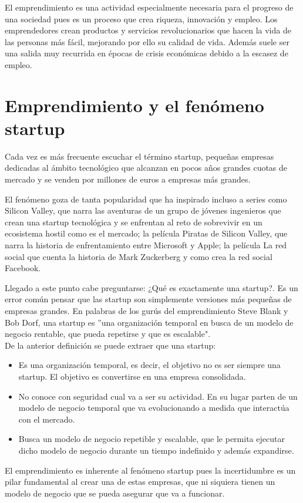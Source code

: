 El emprendimiento es una actividad especialmente necesaria para el progreso de una sociedad pues es un proceso que crea riqueza, innovación y empleo. Los emprendedores crean productos y servicios revolucionarios que hacen la vida de las personas más fácil, mejorando por ello su calidad de vida. Además suele ser una salida muy recurrida en épocas de crisis económicas debido a la escasez de empleo.

\section{Emprendimiento y el fenómeno startup}

Cada vez es más frecuente escuchar el término startup, pequeñas empresas dedicadas al ámbito tecnológico que alcanzan en pocos años grandes cuotas de mercado y se venden por millones de euros a empresas más grandes.

 El fenómeno goza de tanta popularidad que ha inspirado incluso a series como Silicon Valley, que narra las aventuras de un grupo de jóvenes ingenieros que crean una startup tecnológica y se enfrentan al reto de sobrevivir en un ecosistema hostil como es el mercado; la película Piratas de Silicon Valley, que narra la historia de enfrentamiento entre Microsoft y Apple; la película La red social que cuenta la historia de Mark Zuckerberg y como crea la red social Facebook.

Llegado a este punto cabe preguntarse: ¿Qué es exactamente una startup?. Es un error común pensar que las startup son simplemente versiones más pequeñas de empresas grandes. En palabras de los gurús del emprendimiento Steve Blank y Bob Dorf, una startup es ''una organización temporal en busca de un modelo de negocio rentable, que pueda repetirse y que es escalable".\\
De la anterior definición se puede extraer que una startup:
\begin{itemize}
	\item Es una organización temporal, es decir, el objetivo no es ser siempre una startup. El objetivo es convertirse en una empresa consolidada.
	\item No conoce con seguridad cual va a ser su actividad. En su lugar parten de un modelo de negocio temporal que va evolucionando a medida que interactúa con el mercado.
	\item Busca un modelo de negocio repetible y escalable, que le permita ejecutar dicho modelo de negocio durante un tiempo indefinido y además expandirse.
\end{itemize}
El emprendimiento es inherente al fenómeno startup pues la incertidumbre es un pilar fundamental al crear una de estas empresas, que ni siquiera tienen un modelo de negocio que se pueda asegurar que va a funcionar.

